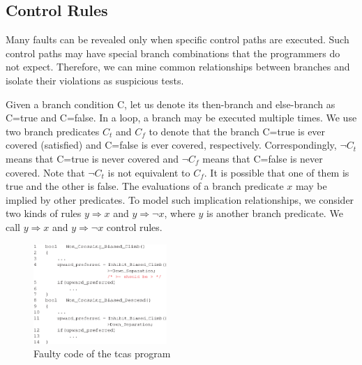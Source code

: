 \documentclass{sig-alternate}
\begin{document}
\subsection{Control Rules}

Many faults can be revealed only when specific control paths are
executed. Such control paths may have special branch combinations
that the programmers do not expect. Therefore, we can mine common
relationships between branches and isolate their violations as
suspicious tests.



Given a branch condition C, let us denote its then-branch and
else-branch as C=true and C=false. In a loop, a branch may be
executed multiple times. We use two branch predicates $C_t$ and
$C_f$ to denote that the branch C=true is ever covered (satisfied)
and C=false is ever covered, respectively. Correspondingly, $\neg
C_t$ means that C=true is never covered and $\neg C_f$ means that
C=false is never covered. Note that $\neg C_t$ is not equivalent to
$C_f$. It is possible that one of them is true and the other is
false. The evaluations of a branch predicate $x$ may be implied by
other predicates. To model such implication relationships, we
consider two kinds of rules $y\Rightarrow x$ and $y\Rightarrow \neg
x$, where
$y$ is another branch predicate. %
We call $y\Rightarrow x$ and $y\Rightarrow \neg x$ control rules.


\begin{figure}[h]
\begin{center}
  \includegraphics[angle=0,width=0.45\textwidth]{figs/example21.eps}
  \centering
  \caption{Faulty code of the tcas program}
  \label{fig:example2}
\end{center} %
\end{figure}
\end{document}
